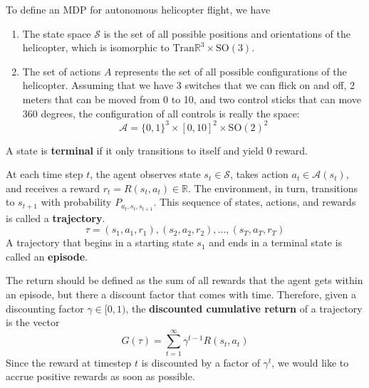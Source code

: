 \documentclass{article}
\begin{document}
  \begin{example}
    To define an MDP for autonomous helicopter flight, we have 
    \begin{enumerate}
      \item The state space $\mathcal{S}$ is the set of all possible positions and orientations of the helicopter, which is isomorphic to $\mathrm{Tran}\mathbb{R}^3 \times \mathrm{SO}(3)$. 
      \item The set of actions $A$ represents the set of all possible configurations of the helicopter. Assuming that we have 3 switches that we can flick on and off, 2 meters that can be moved from 0 to 10, and two control sticks that can move 360 degrees, the configuration of all controls is really the space: 
        \begin{equation}
          \mathcal{A} = \{0, 1\}^3 \times [0, 10]^2 \times \mathrm{SO}(2)^2
        \end{equation}
    \end{enumerate}
  \end{example}

  \begin{definition}
    A state is \textbf{terminal} if it only transitions to itself and yield $0$ reward. 
  \end{definition}

  \begin{definition}[Trajectory]
    At each time step $t$, the agent observes state $s_t \in \mathcal{S}$, takes action $a_t \in \mathcal{A}(s_t)$, and receives a reward $r_t = R(s_t, a_t) \in \mathbb{R}$. The environment, in turn, transitions to $s_{t+1}$ with probability $P_{a_t, s_t, s_{t+1}}$. This sequence of states, actions, and rewards is called a \textbf{trajectory}. 
    \begin{equation}
      \tau = (s_1, a_1, r_1), (s_2, a_2, r_2), \ldots, (s_T, a_T, r_T)
    \end{equation}
    A trajectory that begins in a starting state $s_1$ and ends in a terminal state is called an \textbf{episode}. 
  \end{definition}

  \begin{definition}[Return]
    The return should be defined as the sum of all rewards that the agent gets within an episode, but there a discount factor that comes with time. Therefore, given a discounting factor $\gamma \in [0, 1)$, the \textbf{discounted cumulative return} of a trajectory is the vector 
    \begin{equation}
      G(\tau) = \sum_{t=1}^\infty \gamma^{t - 1} R(s_t, a_t)
    \end{equation}
    Since the reward at timestep $t$ is discounted by a factor of $\gamma^t$, we would like to accrue positive rewards as soon as possible.
  \end{definition}
\end{document}
